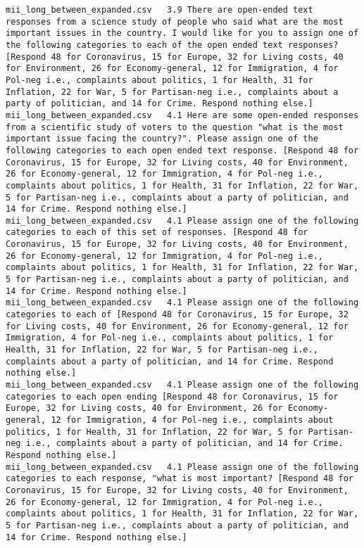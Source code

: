 \begin{lstlisting}[label=lst:promptvariants]
mii_long_between_expanded.csv	3.9	There are open-ended text responses from a science study of people who said what are the most important issues in the country. I would like for you to assign one of the following categories to each of the open ended text responses? [Respond 48 for Coronavirus, 15 for Europe, 32 for Living costs, 40 for Environment, 26 for Economy-general, 12 for Immigration, 4 for Pol-neg i.e., complaints about politics, 1 for Health, 31 for Inflation, 22 for War, 5 for Partisan-neg i.e., complaints about a party of politician, and 14 for Crime. Respond nothing else.]
mii_long_between_expanded.csv	4.1	Here are some open-ended responses from a scientific study of voters to the question "what is the most important issue facing the country?". Please assign one of the following categories to each open ended text response. [Respond 48 for Coronavirus, 15 for Europe, 32 for Living costs, 40 for Environment, 26 for Economy-general, 12 for Immigration, 4 for Pol-neg i.e., complaints about politics, 1 for Health, 31 for Inflation, 22 for War, 5 for Partisan-neg i.e., complaints about a party of politician, and 14 for Crime. Respond nothing else.]
mii_long_between_expanded.csv	4.1	Please assign one of the following categories to each of this set of responses. [Respond 48 for Coronavirus, 15 for Europe, 32 for Living costs, 40 for Environment, 26 for Economy-general, 12 for Immigration, 4 for Pol-neg i.e., complaints about politics, 1 for Health, 31 for Inflation, 22 for War, 5 for Partisan-neg i.e., complaints about a party of politician, and 14 for Crime. Respond nothing else.]
mii_long_between_expanded.csv	4.1	Please assign one of the following categories to each of [Respond 48 for Coronavirus, 15 for Europe, 32 for Living costs, 40 for Environment, 26 for Economy-general, 12 for Immigration, 4 for Pol-neg i.e., complaints about politics, 1 for Health, 31 for Inflation, 22 for War, 5 for Partisan-neg i.e., complaints about a party of politician, and 14 for Crime. Respond nothing else.]
mii_long_between_expanded.csv	4.1	Please assign one of the following categories to each open ending [Respond 48 for Coronavirus, 15 for Europe, 32 for Living costs, 40 for Environment, 26 for Economy-general, 12 for Immigration, 4 for Pol-neg i.e., complaints about politics, 1 for Health, 31 for Inflation, 22 for War, 5 for Partisan-neg i.e., complaints about a party of politician, and 14 for Crime. Respond nothing else.]
mii_long_between_expanded.csv	4.1	Please assign one of the following categories to each response, "what is most important? [Respond 48 for Coronavirus, 15 for Europe, 32 for Living costs, 40 for Environment, 26 for Economy-general, 12 for Immigration, 4 for Pol-neg i.e., complaints about politics, 1 for Health, 31 for Inflation, 22 for War, 5 for Partisan-neg i.e., complaints about a party of politician, and 14 for Crime. Respond nothing else.]

\end{lstlisting}
